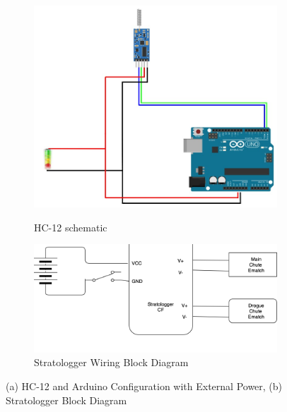 \begin{figure}[H]
    \begin{subfigure}[b]{.49\linewidth}
        \centering
        \includegraphics[width=\linewidth]{img/AV/HC12.jpg}
        \label{HC-12schematics}
        \caption{HC-12 schematic}
    \end{subfigure}
    \begin{subfigure}[b]{.49\linewidth}
        \centering
        \includegraphics[width=\linewidth]{img/AV/StratoLogger.png}
        \caption{Stratologger Wiring Block Diagram}
    \end{subfigure}
    \caption{(a) HC-12 and Arduino Configuration with External Power, (b) Stratologger Block Diagram}
\end{figure}

